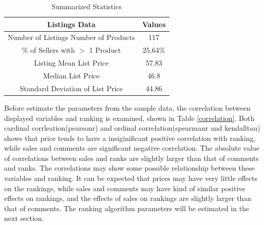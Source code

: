 \documentclass{article}
\begin{document}
\begin{table}[H]
\centering
\begin{tabular}{|c|c|}
\hline
\textbf{Listings Data} & \textbf{Values} \\
\hline 
Number of Listings Number of Products & 117 \\
\hline
\% of Sellers with $>$ 1 Product & 25.64\% \\
\hline
Listing Mean List Price & 57.83  \\
\hline 
Median List Price & 46.8  \\
\hline
Standard Deviation of List Price & 44.86 \\
\hline
\end{tabular}
\caption{\label{summary}Summarized Statistics}
\end{table}

Before estimate the parameters from the sample data, the correlation between displayed variables and ranking is examined, shown in Table \ref{correlation}. Both cardinal corrleation(pearsonr) and ordinal correlation(spearmanr and kendalltau) shows that price tends to have a insiginificant positive correlation with ranking, while sales and comments are significant negative correlation. The absolute value of correlations between sales and ranks are slightly larger than that of comments and ranks. The correlations may show some possible relationship between these variables and ranking. It can be expected that prices may have very little effects on the rankings, while sales and comments may have kind of similar positive effects on rankings, and the effects of sales on rankings are slightly larger than that of comments. The ranking algorithm parameters will be estimated in the next section.
\end{document}
